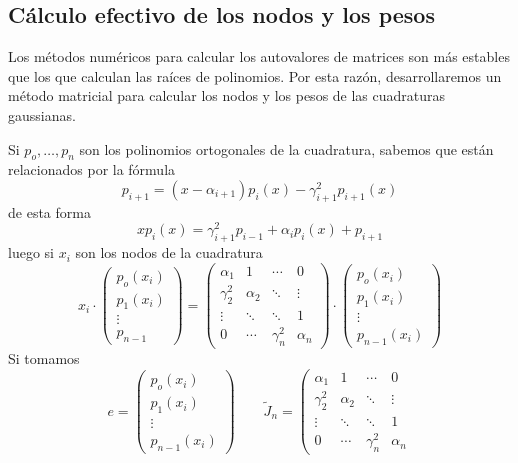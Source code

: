 \subsection{Cálculo efectivo de los nodos y los pesos}
\begin{obs}
Los métodos numéricos para calcular los autovalores de matrices son más estables que los que calculan las raíces de polinomios. Por esta razón, desarrollaremos un método matricial para calcular los nodos y los pesos de las cuadraturas gaussianas.
\end{obs}
\begin{met}
Si $p_o,\ldots,p_n$ son los polinomios ortogonales de la cuadratura, sabemos que están relacionados por la fórmula
$$p_{i+1}=(x-\alpha_{i+1})p_i(x)-\gamma_{i+1}^2p_{i+1}(x)$$
de esta forma
$$xp_i(x)=\gamma_{i+1}^2p_{i-1}+\alpha_ip_i(x)+p_{i+1}$$
luego si $x_i$ son los nodos de la cuadratura
$$x_i\cdot\left(\begin{array}{c}
     p_o(x_i) \\
      p_1(x_i)\\
      \vdots\\
      p_{n-1}
\end{array}\right)=\left(\begin{array}{cccc}
     \alpha_1&1&\cdots&0 \\
      \gamma_2^2&\alpha_2&\ddots&\vdots\\
      \vdots&\ddots&\ddots&1\\
      0&\cdots&\gamma_n^2&\alpha_n
\end{array}\right)\cdot \left(\begin{array}{c}
     p_o(x_i) \\
      p_1(x_i)\\
      \vdots\\
      p_{n-1}(x_i)
\end{array}\right) $$
Si tomamos
$$e=\left(\begin{array}{c}
     p_o(x_i) \\
      p_1(x_i)\\
      \vdots\\
      p_{n-1}(x_i)
\end{array}\right)\qquad \tilde{J}_n=\left(\begin{array}{cccc}
     \alpha_1&1&\cdots&0 \\
      \gamma_2^2&\alpha_2&\ddots&\vdots\\
      \vdots&\ddots&\ddots&1\\
      0&\cdots&\gamma_n^2&\alpha_n

\end{array}$$
\end{met}
